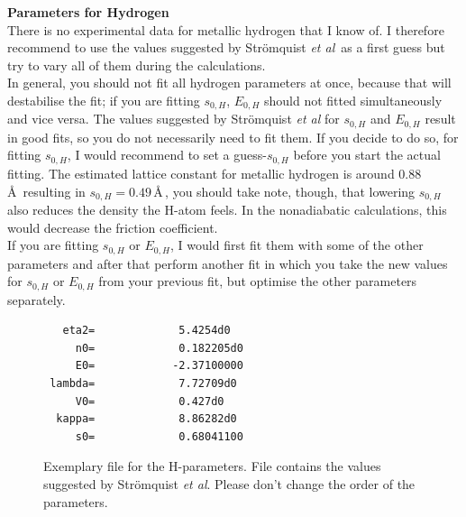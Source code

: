 \documentclass[twoside, 11pt, titlepage, captions=nooneline, a4paper, headsepline]{scrbook}%
\begin{document}
\textbf{Parameters for Hydrogen}\\
There is no experimental data for metallic hydrogen that I know of. I therefore recommend to use the values suggested by Strömquist \emph{et al}\,\cite{strom1998} as a first guess but try to vary all of them during the calculations.\\
In general, you should not fit all hydrogen parameters at once, because that will destabilise the fit; if you are fitting $s_{0,H}$, $E_{0,H}$ should not fitted simultaneously and vice versa. The values suggested by Strömquist \emph{et al} for $s_{0,H}$ and $E_{0,H}$ result in good fits, so you do not necessarily need to fit them. If you decide to do so, for fitting $s_{0,H}$, I would recommend to set a guess-$s_{0,H}$ before you start the actual fitting. The estimated lattice constant for metallic hydrogen is around 0.88\,\AA~resulting in $s_{0,H}=0.49$\,\AA\,\cite{wigner1935}, you should take note, though, that lowering $s_{0,H}$ also reduces the density the H-atom feels. In the nonadiabatic calculations, this would decrease the friction coefficient.\\
If you are fitting $s_{0,H}$ or $E_{0,H}$, I would first fit them with some of the other parameters and after that perform another fit in which you take the new values for $s_{0,H}$ or $E_{0,H}$ from your previous fit, but optimise the other parameters separately.\\
\begin{figure}[t!]
\begin{verbatim}
   eta2=             5.4254d0
     n0=             0.182205d0
     E0=            -2.37100000
 lambda=             7.72709d0
     V0=             0.427d0
  kappa=             8.86282d0
     s0=             0.68041100
\end{verbatim}
\caption{Exemplary file for the H-parameters. File contains the values suggested by Strömquist \emph{et al}. Please don't change the order of the parameters.}
\label{Mdtianfit}
\end{figure}
\end{document}
